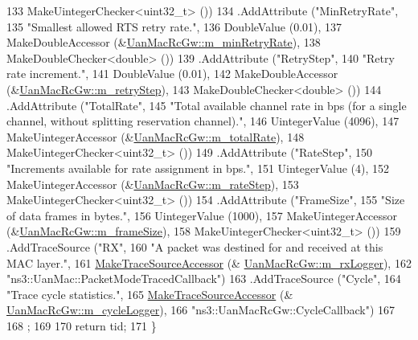 \begin{DoxyCode}
133                    MakeUintegerChecker<uint32\_t> ())
134     .AddAttribute (\textcolor{stringliteral}{"MinRetryRate"},
135                    \textcolor{stringliteral}{"Smallest allowed RTS retry rate."},
136                    DoubleValue (0.01),
137                    MakeDoubleAccessor (&\hyperlink{classns3_1_1UanMacRcGw_a1b80a997bc4b47fad40ee75304605786}{UanMacRcGw::m\_minRetryRate}),
138                    MakeDoubleChecker<double> ())
139     .AddAttribute (\textcolor{stringliteral}{"RetryStep"},
140                    \textcolor{stringliteral}{"Retry rate increment."},
141                    DoubleValue (0.01),
142                    MakeDoubleAccessor (&\hyperlink{classns3_1_1UanMacRcGw_add3041a7bf45e5d81fff4600ba20caf6}{UanMacRcGw::m\_retryStep}),
143                    MakeDoubleChecker<double> ())
144     .AddAttribute (\textcolor{stringliteral}{"TotalRate"},
145                    \textcolor{stringliteral}{"Total available channel rate in bps (for a single channel, without splitting
       reservation channel)."},
146                    UintegerValue (4096),
147                    MakeUintegerAccessor (&\hyperlink{classns3_1_1UanMacRcGw_aba72112136797b9263624046a7f96b4b}{UanMacRcGw::m\_totalRate}),
148                    MakeUintegerChecker<uint32\_t> ())
149     .AddAttribute (\textcolor{stringliteral}{"RateStep"},
150                    \textcolor{stringliteral}{"Increments available for rate assignment in bps."},
151                    UintegerValue (4),
152                    MakeUintegerAccessor (&\hyperlink{classns3_1_1UanMacRcGw_a358dc1512c2e94359c1892eae090f7e1}{UanMacRcGw::m\_rateStep}),
153                    MakeUintegerChecker<uint32\_t> ())
154     .AddAttribute (\textcolor{stringliteral}{"FrameSize"},
155                    \textcolor{stringliteral}{"Size of data frames in bytes."},
156                    UintegerValue (1000),
157                    MakeUintegerAccessor (&\hyperlink{classns3_1_1UanMacRcGw_a7cb11b74720c0aa781dea646ac940ac4}{UanMacRcGw::m\_frameSize}),
158                    MakeUintegerChecker<uint32\_t> ())
159     .AddTraceSource (\textcolor{stringliteral}{"RX"},
160                      \textcolor{stringliteral}{"A packet was destined for and received at this MAC layer."},
161                      \hyperlink{group__tracing_gab21a770b9855af4e8f69f7531ea4a6b0}{MakeTraceSourceAccessor} (&
      \hyperlink{classns3_1_1UanMacRcGw_af9c5b278e86a12e4aea40599b721f18e}{UanMacRcGw::m\_rxLogger}),
162                      \textcolor{stringliteral}{"ns3::UanMac::PacketModeTracedCallback"})
163     .AddTraceSource (\textcolor{stringliteral}{"Cycle"},
164                      \textcolor{stringliteral}{"Trace cycle statistics."},
165                      \hyperlink{group__tracing_gab21a770b9855af4e8f69f7531ea4a6b0}{MakeTraceSourceAccessor} (&
      \hyperlink{classns3_1_1UanMacRcGw_a4c743f84c92dcc29b476cfd229d68dd8}{UanMacRcGw::m\_cycleLogger}),
166                      \textcolor{stringliteral}{"ns3::UanMacRcGw::CycleCallback"})
167 
168   ;
169 
170   \textcolor{keywordflow}{return} tid;
171 \}
\end{DoxyCode}


